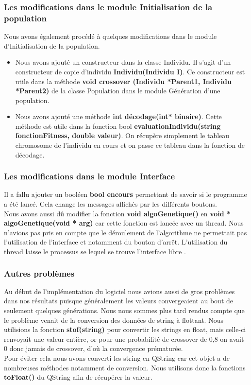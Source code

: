 \documentclass[a4paper,11pt]{article}
\begin{document}
			\subsubsection{Les modifications dans le module Initialisation de la population}
				Nous avons également procédé à quelques modifications dans le module d’Initialisation de la population.\\
				\begin{itemize}
					\item Nous avons ajouté un constructeur dans la classe Individu. Il s’agit d’un constructeur de copie d’individu  \textbf{Individu(Individu I)}. Ce constructeur est utile dans la méthode  \textbf{void crossover (Individu *Parent1, Individu *Parent2)} de la classe Population dans le module Génération d’une population.

					\item Nous avons ajouté une méthode  \textbf{int décodage(int* binaire)}. Cette méthode est  utile dans la fonction bool  \textbf{evaluationIndividu(string fonctionFitness, double valeur)}. On récupère simplement le tableau chromosome de l’individu en cours et on passe ce tableau dans la fonction de décodage.\\
				\end{itemize}

			\subsubsection{Les modifications dans le module Interface}
				Il a fallu ajouter un booléen  \textbf{bool encours} permettant de savoir si le programme a été lancé. Cela change les messages affichés par les différents boutons.\\
				Nous avons aussi dû modifier la fonction  \textbf{void algoGenetique()} en  \textbf{void * algoGenetique(void * arg)} car cette fonction est lancée avec un thread.
				Nous n’avions pas pris en compte que le déroulement de l’algorithme ne permettait pas l’utilisation de l’interface et notamment du bouton d'arrêt. L’utilisation du thread laisse le processus se lequel se trouve l’interface libre .\\

			\subsubsection{Autres problèmes}
				Au début de l'implémentation du logiciel nous avions aussi de gros problèmes dans nos résultats puisque généralement les valeurs convergeaient au bout de seulement quelques générations. Nous nous sommes plus tard rendus compte que le problème venait de la conversion des données de string à flottant. Nous utilisions la fonction  \textbf{stof(string)} pour convertir les strings en float, mais celle-ci renvoyait une valeur entière, or pour une probabilité de crossover de 0,8 on avait 0 donc jamais de crossover, d’où la convergence prématurée.\\
				Pour éviter cela nous avons converti les string en QString car cet objet a de nombreuses méthodes notamment de conversion. Nous utilisons donc la fonctions  \textbf{toFloat()} du QString afin de récupérer la valeur.\\
\end{document}
